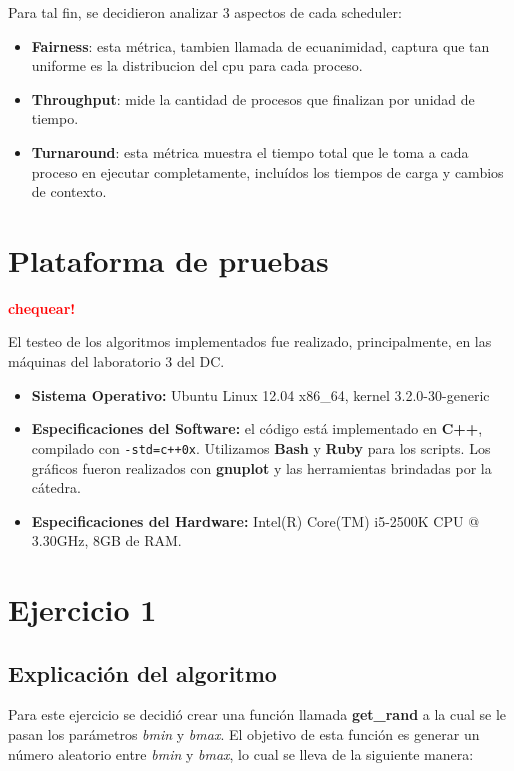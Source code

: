 \documentclass[a4paper]{article}
\begin{document}
Para tal fin, se decidieron analizar 3 aspectos de cada scheduler:

\begin{itemize}
  \item \textbf{Fairness}: esta métrica, tambien llamada de ecuanimidad,
  captura que tan uniforme es la distribucion del cpu para cada proceso.
  \item \textbf{Throughput}: mide la cantidad de procesos que finalizan por
  unidad de tiempo.
  \item \textbf{Turnaround}: esta métrica muestra el tiempo total que le
  toma a cada proceso en ejecutar completamente, incluídos los tiempos de
  carga y cambios de contexto.
\end{itemize}
\newpage


\section{Plataforma de pruebas}

\textcolor{red}{\textbf{chequear!}} \medskip

El testeo de los algoritmos implementados fue realizado, principalmente, en
las máquinas del laboratorio 3 del DC.
\begin{itemize}
  \item \textbf{Sistema Operativo:} Ubuntu Linux 12.04 x86_64,
  kernel 3.2.0-30-generic
  \item \textbf{Especificaciones del Software:} el código está implementado
  en \textbf{C++}, compilado con \verb|-std=c++0x|. Utilizamos \textbf{Bash}
  y \textbf{Ruby} para los scripts. Los gráficos fueron realizados con
  \textbf{gnuplot} y las herramientas brindadas por la cátedra.
  \item \textbf{Especificaciones del Hardware:} Intel(R) Core(TM) i5-2500K
  CPU @ 3.30GHz, 8GB de RAM.
\end{itemize}

\newpage


\section{Ejercicio 1}

\subsection{Explicación del algoritmo}
Para este ejercicio se decidió crear una función llamada \textbf{get\_rand}
a la cual se le pasan los parámetros \textit{bmin} y \textit{bmax}. El
objetivo de esta función es generar un número aleatorio entre \textit{bmin}
y \textit{bmax}, lo cual se lleva de la siguiente manera:
\end{document}
